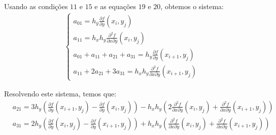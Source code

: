 \documentclass[a4paper, 12pt]{article}
\begin{document}
Usando as condições $11$ e $15$ e as equações $19$ e $20$, obtemos o sistema:
\begin{align*}
    \begin{cases}
        a_{01} = h_{y} \frac{\partial f}{\partial y}(x_i, y_j) \\
        a_{11} = h_x h_y \frac{\partial^2 f}{\partial x \partial y}(x_i, y_j)\\
        a_{01} + a_{11} + a_{21} + a_{31} = h_y \frac{\partial f}{\partial y}(x_{i+1}, y_j)\\
        a_{11} + 2a_{21} + 3a_{31} =  h_x h_y \frac{\partial^2 f}{\partial x \partial y}(x_{i+1}, y_j)
    \end{cases}
\end{align*}

Resolvendo este sistema, temos que:
\begin{align}
    &a_{21} = 3h_y\left(\frac{\partial f}{\partial y}(x_{i+1}, y_j) - \frac{\partial f}{\partial y}(x_{i}, y_{j})\right) - 
    h_x h_y \left(2\frac{\partial^2 f}{\partial x \partial y}(x_i, y_j) + \frac{\partial^2 f}{\partial x \partial y}(x_{i+1}, y_j) \right)
    \tag{27} \\
    &a_{31} = 2h_y\left(\frac{\partial f}{\partial y}(x_{i}, y_{j}) - \frac{\partial f}{\partial y}(x_{i+1}, y_j)\right) + 
    h_x h_y\left(\frac{\partial^2 f}{\partial x \partial y}(x_i, y_j) + \frac{\partial^2 f}{\partial x \partial y}(x_{i+1}, y_j)\right)
    \tag{28}
\end{align}
\end{document}
